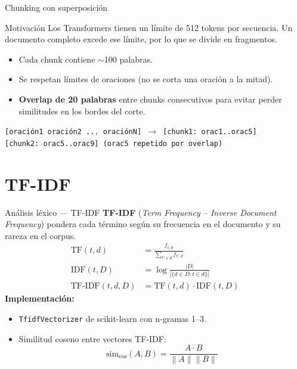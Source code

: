 \documentclass[aspectratio=169]{beamer}
\begin{document}
\begin{frame}{Chunking con superposición}
  \begin{block}{Motivación}
    Los Transformers tienen un límite de 512 tokens por secuencia. Un documento completo excede ese límite, por lo que se divide en fragmentos.
  \end{block}
  \begin{itemize}
    \item Cada chunk contiene $\sim$100 palabras.
    \item Se respetan límites de oraciones (no se corta una oración a la mitad).
    \item \textbf{Overlap de 20 palabras} entre chunks consecutivos para evitar perder similitudes en los bordes del corte.
  \end{itemize}
  \vspace{0.5em}
  \begin{center}
    \small
    \texttt{[oración1 oración2 ... oraciónN] $\rightarrow$ [chunk1: orac1..orac5]} \\
    \texttt{[chunk2: orac5..orac9] \hspace{3.9em}(orac5 repetido por overlap)}
  \end{center}
\end{frame}

\section{TF-IDF}

\begin{frame}{Análisis léxico — TF-IDF}
  \textbf{TF-IDF} (\textit{Term Frequency -- Inverse Document Frequency}) pondera cada término según su frecuencia en el documento y su rareza en el corpus.
  \vspace{0.5em}
  \begin{align*}
    \text{TF}(t, d) &= \frac{f_{t,d}}{\sum_{t' \in d} f_{t',d}} \\[0.5em]
    \text{IDF}(t, D) &= \log\frac{|D|}{|\{d \in D : t \in d\}|} \\[0.5em]
    \text{TF-IDF}(t, d, D) &= \text{TF}(t, d) \cdot \text{IDF}(t, D)
  \end{align*}
  \vspace{0.5em}
  \textbf{Implementación:}
  \begin{itemize}
    \item \texttt{TfidfVectorizer} de scikit-learn con n-gramas 1--3.
    \item Similitud coseno entre vectores TF-IDF:
          \[
          \text{sim}_{\text{cos}}(A, B) = \frac{A \cdot B}{\|A\| \|B\|}
          \]
  \end{itemize}
\end{frame}
\end{document}
